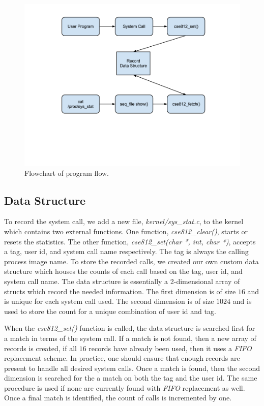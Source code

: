 \documentclass[conference]{IEEEtran}
\begin{document}
\begin{figure}[t!]
  \begin{center}
    \includegraphics[trim=120 230 90 50, clip, width=1.0\linewidth]{figure.png}
    \vspace{-0.18in}
  \end{center}
  \caption{Flowchart of program flow.}
  \label{fig:figure}
\end{figure}

\subsection{Data Structure}
To record the system call, we add a new file, \textit{kernel/sys\_stat.c}, to the kernel which contains two external functions.
One function, \textit{cse812\_clear()}, starts or resets the statistics.
The other function, \textit{cse812\_set(char *, int, char *)}, accepts a tag, user id, and system call name respectively.
The tag is always the calling process image name.
To store the recorded calls, we created our own custom data structure which houses the counts of each call based on the tag, user id, and system call name.
The data structure is essentially a 2-dimensional array of structs which record the needed information.
The first dimension is of size $16$ and is unique for each system call used.
The second dimension is of size $1024$ and is used to store the count for a unique combination of user id and tag.

When the \textit{cse812\_set()} function is called, the data structure is searched first for a match in terms of the system call.
If a match is not found, then a new array of records is created, if all $16$ records have already been used, then it uses a \textit{FIFO} replacement scheme.
In practice, one should ensure that enough records are present to handle all desired system calls.
Once a match is found, then the second dimension is searched for the a match on both the tag and the user id.
The same procedure is used if none are currently found with \textit{FIFO} replacement as well.
Once a final match is identified, the count of calls is incremented by one.
\end{document}
